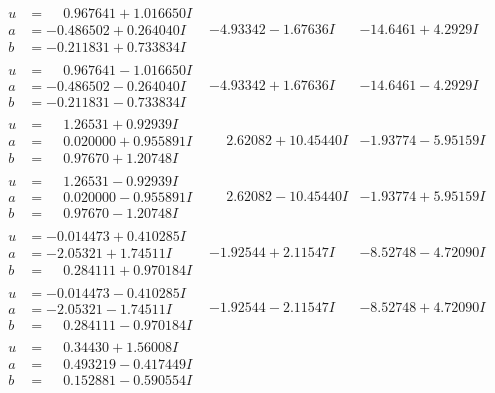 \documentclass[1p]{elsarticle_modified}
\theoremstyle{definition}
\begin{document}
$$\begin{array}{c|c|c}
\begin{aligned}
u &= \phantom{-}0.967641 + 1.016650 I \\
a &= -0.486502 + 0.264040 I \\
b &= -0.211831 + 0.733834 I\end{aligned}
 & -4.93342 - 1.67636 I & -14.6461 + 4.2929 I \\ \hline\begin{aligned}
u &= \phantom{-}0.967641 - 1.016650 I \\
a &= -0.486502 - 0.264040 I \\
b &= -0.211831 - 0.733834 I\end{aligned}
 & -4.93342 + 1.67636 I & -14.6461 - 4.2929 I \\ \hline\begin{aligned}
u &= \phantom{-}1.26531 + 0.92939 I \\
a &= \phantom{-}0.020000 + 0.955891 I \\
b &= \phantom{-}0.97670 + 1.20748 I\end{aligned}
 & \phantom{-}2.62082 + 10.45440 I & -1.93774 - 5.95159 I \\ \hline\begin{aligned}
u &= \phantom{-}1.26531 - 0.92939 I \\
a &= \phantom{-}0.020000 - 0.955891 I \\
b &= \phantom{-}0.97670 - 1.20748 I\end{aligned}
 & \phantom{-}2.62082 - 10.45440 I & -1.93774 + 5.95159 I \\ \hline\begin{aligned}
u &= -0.014473 + 0.410285 I \\
a &= -2.05321 + 1.74511 I \\
b &= \phantom{-}0.284111 + 0.970184 I\end{aligned}
 & -1.92544 + 2.11547 I & -8.52748 - 4.72090 I \\ \hline\begin{aligned}
u &= -0.014473 - 0.410285 I \\
a &= -2.05321 - 1.74511 I \\
b &= \phantom{-}0.284111 - 0.970184 I\end{aligned}
 & -1.92544 - 2.11547 I & -8.52748 + 4.72090 I \\ \hline\begin{aligned}
u &= \phantom{-}0.34430 + 1.56008 I \\
a &= \phantom{-}0.493219 - 0.417449 I \\
b &= \phantom{-}0.152881 - 0.590554 I\end{aligned}

\end{array}$$
\end{document}
